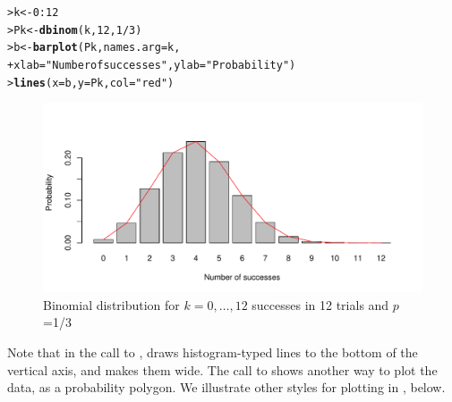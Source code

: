 \documentclass[10pt,krantz2]{krantz}\usepackage[]{graphicx}\usepackage[]{color}
\makeatletter
\newcommand{\hlnum}[1]{\textcolor[rgb]{0.686,0.059,0.569}{#1}}%
\newcommand{\hlstr}[1]{\textcolor[rgb]{0.192,0.494,0.8}{#1}}%
\newcommand{\hlopt}[1]{\textcolor[rgb]{0,0,0}{#1}}%
\newcommand{\hlstd}[1]{\textcolor[rgb]{0.345,0.345,0.345}{#1}}%
\newcommand{\hlkwb}[1]{\textcolor[rgb]{0.69,0.353,0.396}{#1}}%
\newcommand{\hlkwc}[1]{\textcolor[rgb]{0.333,0.667,0.333}{#1}}%
\newcommand{\hlkwd}[1]{\textcolor[rgb]{0.737,0.353,0.396}{\textbf{#1}}}%
\newenvironment{kframe}{%
 \def\at@end@of@kframe{}%
 \ifinner\ifhmode%
  \def\at@end@of@kframe{\end{minipage}}%
  \begin{minipage}{\columnwidth}%
 \fi\fi%
 \def\FrameCommand##1{\hskip\@totalleftmargin \hskip-\fboxsep
 \colorbox{shadecolor}{##1}\hskip-\fboxsep
     \hskip-\linewidth \hskip-\@totalleftmargin \hskip\columnwidth}%
 \MakeFramed {\advance\hsize-\width
   \@totalleftmargin\z@ \linewidth\hsize
   \@setminipage}}%
 {\par\unskip\endMakeFramed%
 \at@end@of@kframe}
\newenvironment{knitrout}{}{} %
\renewenvironment{knitrout}{\small\renewcommand{\baselinestretch}{.85}}{} %
\makeatother
\begin{document}
\begin{knitrout}
\color{fgcolor}\begin{kframe}
\begin{alltt}
\hlstd{> }\hlstd{k} \hlkwb{<-} \hlnum{0} \hlopt{:} \hlnum{12}
\hlstd{> }\hlstd{Pk} \hlkwb{<-} \hlkwd{dbinom}\hlstd{(k,} \hlnum{12}\hlstd{,} \hlnum{1}\hlopt{/}\hlnum{3}\hlstd{)}
\hlstd{> }\hlstd{b} \hlkwb{<-} \hlkwd{barplot}\hlstd{(Pk,} \hlkwc{names.arg} \hlstd{= k,}
\hlstd{+ }             \hlkwc{xlab} \hlstd{=} \hlstr{"Number of successes"}\hlstd{,} \hlkwc{ylab} \hlstd{=} \hlstr{"Probability"}\hlstd{)}
\hlstd{> }\hlkwd{lines}\hlstd{(}\hlkwc{x} \hlstd{= b,} \hlkwc{y} \hlstd{= Pk,} \hlkwc{col} \hlstd{=} \hlstr{"red"}\hlstd{)}
\end{alltt}
\end{kframe}\begin{figure}[!htbp]

\centerline{\includegraphics[width=.75\textwidth]{ch03/fig/dbinom12-1} }

\caption[Binomial distribution for ]{Binomial distribution for $k=0,\dots,12$ successes in 12 trials and $p$=1/3\label{fig:dbinom12}}
\end{figure}


\end{knitrout}
Note that in the call to ,  draws histogram-typed
lines to the bottom of the vertical axis, and  makes them wide.
The call to  shows another way to plot the data, as a probability
polygon. We illustrate other styles for plotting in ,
 below.
\end{document}
